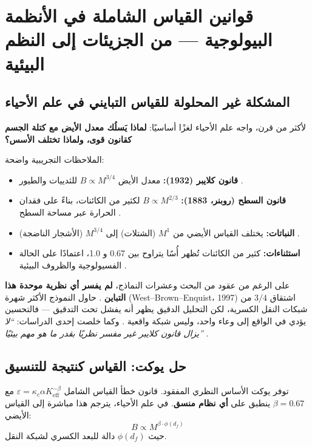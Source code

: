 \documentclass[11pt,a4paper]{article}
\newcommand{\Keff}{K_{\mathrm{eff}}}
\begin{document}
	\section{قوانين القياس الشاملة في الأنظمة البيولوجية — من الجزيئات إلى النظم البيئية}
	\label{sec:bio-scaling}
	
	\subsection{المشكلة غير المحلولة للقياس التبايني في علم الأحياء}
	
	لأكثر من قرن، واجه علم الأحياء لغزًا أساسيًا: \textbf{لماذا يَسلُك معدل الأيض مع كتلة الجسم كقانون قوى، ولماذا تختلف الأسس؟}
	
	الملاحظات التجريبية واضحة:
	\begin{itemize}
		\item \textbf{قانون كلايبر (1932):} معدل الأيض \(B \propto M^{3/4}\) للثدييات والطيور \cite{Kleiber1932,West1997}.
		\item \textbf{قانون السطح (روبنر، 1883):} \(B \propto M^{2/3}\) لكثير من الكائنات، بناءً على فقدان الحرارة عبر مساحة السطح \cite{Rubner1883}.
		\item \textbf{النباتات:} يختلف القياس الأيضي من \(M^{1}\) (الشتلات) إلى \(M^{3/4}\) (الأشجار الناضجة) \cite{Reich2006}.
		\item \textbf{استثناءات:} كثير من الكائنات تُظهر أُسًا يتراوح بين 0.67 و 1.0، اعتمادًا على الحالة الفسيولوجية والظروف البيئية \cite{Glazier2005}.
	\end{itemize}
	
	على الرغم من عقود من البحث وعشرات النماذج، \textbf{لم يفسر أي نظرية موحدة هذا التباين} \cite{Agutter2004}. حاول النموذج الأكثر شهرة (West–Brown–Enquist، 1997) اشتقاق \(3/4\) من شبكات النقل الكسرية، لكن التحليل الدقيق يظهر أنه يفشل تحت التدقيق — فالتحسين يؤدي في الواقع إلى وعاء واحد، وليس شبكة واقعية \cite{Dodds2001}. وكما خلصت إحدى الدراسات: \textit{``لا يزال قانون كلايبر غير مفسر نظريًا بقدر ما هو مهم بيئيًا''} \cite{Agutter2004}.
	
	\subsection{حل يوكت: القياس كنتيجة للتنسيق}
	
	توفر يوكت الأساس النظري المفقود. قانون خطأ القياس الشامل \(\varepsilon = \kappa_c \alpha \Keff^{-\beta}\) مع \(\beta = 0.67\) ينطبق على \textbf{أي نظام منسق}. في علم الأحياء، يترجم هذا مباشرة إلى القياس الأيضي:
	\begin{equation}
		B \propto M^{\beta \cdot \phi(d_f)}
	\end{equation}
	حيث \(\phi(d_f)\) دالة للبعد الكسري لشبكة النقل.
	
\end{document}
